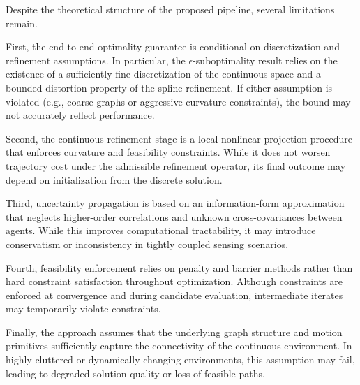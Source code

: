 
Despite the theoretical structure of the proposed pipeline, several limitations remain.

First, the end-to-end optimality guarantee is conditional on discretization and refinement assumptions. In particular, the $\epsilon$-suboptimality result relies on the existence of a sufficiently fine discretization of the continuous space and a bounded distortion property of the spline refinement. If either assumption is violated (e.g., coarse graphs or aggressive curvature constraints), the bound may not accurately reflect performance.

Second, the continuous refinement stage is a local nonlinear projection procedure that enforces curvature and feasibility constraints. While it does not worsen trajectory cost under the admissible refinement operator, its final outcome may depend on initialization from the discrete solution.

Third, uncertainty propagation is based on an information-form approximation that neglects higher-order correlations and unknown cross-covariances between agents. While this improves computational tractability, it may introduce conservatism or inconsistency in tightly coupled sensing scenarios.

Fourth, feasibility enforcement relies on penalty and barrier methods rather than hard constraint satisfaction throughout optimization. Although constraints are enforced at convergence and during candidate evaluation, intermediate iterates may temporarily violate constraints.

Finally, the approach assumes that the underlying graph structure and motion primitives sufficiently capture the connectivity of the continuous environment. In highly cluttered or dynamically changing environments, this assumption may fail, leading to degraded solution quality or loss of feasible paths.